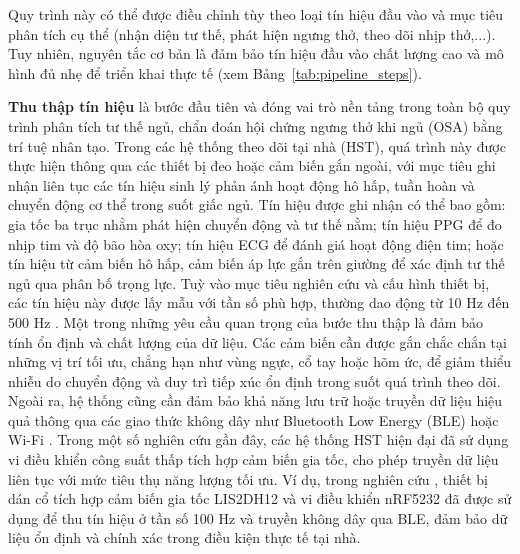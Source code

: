 Quy trình này có thể được điều chỉnh tùy theo loại tín hiệu đầu vào và 
mục tiêu phân tích cụ thể (nhận diện tư thế, phát hiện ngưng thở, 
theo dõi nhịp thở,...). Tuy nhiên, nguyên tắc cơ bản là đảm bảo tín 
hiệu đầu vào chất lượng cao và mô hình đủ nhẹ để triển khai thực tế (xem Bảng~\ref{tab:pipeline_steps}).



\textbf{Thu thập tín hiệu} là bước đầu tiên và đóng vai trò nền tảng 
trong toàn bộ quy trình phân tích tư thế ngủ, chẩn đoán hội chứng ngưng 
thở khi ngủ (OSA) bằng trí tuệ nhân tạo. Trong các hệ thống theo dõi tại 
nhà (HST), quá trình này được thực hiện thông qua các thiết bị đeo hoặc 
cảm biến gắn ngoài, với mục tiêu ghi nhận liên tục các tín hiệu sinh 
lý phản ánh hoạt động hô hấp, tuần hoàn và chuyển động cơ thể trong 
suốt giấc ngủ.
Tín hiệu được ghi nhận có thể bao gồm: gia tốc ba trục nhằm phát hiện 
chuyển động và tư thế nằm; tín hiệu PPG để đo nhịp tim và độ bão hòa oxy; 
tín hiệu ECG để đánh giá hoạt động điện tim; hoặc tín hiệu từ cảm biến hô 
hấp, cảm biến áp lực gắn trên giường để xác định tư thế ngủ qua phân 
bố trọng lực. Tuỳ vào mục tiêu nghiên cứu và cấu hình thiết bị, các tín 
hiệu này được lấy mẫu với tần số phù hợp, thường dao động từ 10 Hz đến 
500 Hz \cite{Sleep_Posture_Detection, Jeng, Zhang_osa, Ferrer_osa, Sang, osa_sanchez2025}.
Một trong những yêu cầu quan trọng của bước thu thập là đảm bảo tính 
ổn định và chất lượng của dữ liệu. Các cảm biến cần được gắn chắc chắn 
tại những vị trí tối ưu, chẳng hạn như vùng ngực, cổ tay hoặc hõm ức, 
để giảm thiểu nhiễu do chuyển động và duy trì tiếp xúc ổn định trong 
suốt quá trình theo dõi. Ngoài ra, hệ thống cũng cần đảm bảo khả năng 
lưu trữ hoặc truyền dữ liệu hiệu quả thông qua các giao thức không dây 
như Bluetooth Low Energy (BLE) hoặc Wi-Fi \cite{thuong_wear_paper, hst_wear_paper}.
Trong một số nghiên cứu gần đây, các hệ thống HST hiện đại đã sử dụng 
vi điều khiển công suất thấp tích hợp cảm biến gia tốc, cho phép truyền 
dữ liệu liên tục với mức tiêu thụ năng lượng tối ưu. Ví dụ, trong nghiên 
cứu \cite{Sleep_Posture_Detection}, thiết bị dán cổ tích hợp cảm biến gia 
tốc LIS2DH12 và vi điều khiển nRF5232 đã được sử dụng để thu tín hiệu ở 
tần số 100 Hz và truyền không dây qua BLE, đảm bảo dữ liệu ổn định và 
chính xác trong điều kiện thực tế tại nhà.

